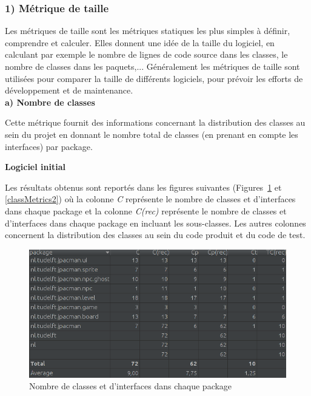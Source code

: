 \documentclass[12pt, openany]{report}
\begin{document}
\subsubsection*{\textbf{\large{1) Métrique de taille}}}


Les métriques de taille sont les métriques statiques les plus simples à définir, comprendre et calculer. Elles donnent une idée de la taille du logiciel, en calculant par exemple le nombre de lignes de code source dans les classes, le nombre de classes dans les paquets,... Généralement les
métriques de taille sont utilisées pour comparer la taille de différents logiciels, pour prévoir les efforts de développement et de maintenance.\\

\textbf{a) Nombre de classes}

Cette métrique fournit des informations concernant la distribution des classes au sein du projet en donnant le nombre total de classes (en prenant en compte les interfaces) par package. 

\textbf{Logiciel initial}

Les résultats obtenus sont reportés dans les figures suivantes (Figures~\ref{classMetrics1} et \ref{classMetrics2}) où la colonne \textit{C} représente le nombre de classes et d'interfaces dans chaque package et la colonne \textit{C(rec)} représente le nombre de classes et d'interfaces dans chaque package en incluant les sous-classes. Les autres colonnes concernent la distribution des classes au sein du code produit et du code de test.

\begin{figure}[!h]
	\centering
	\includegraphics[scale=0.6]{Images/classMetrics1.png} 
	\caption{Nombre de classes et d'interfaces dans chaque package}
	\label{classMetrics1}
\end{figure}
\end{document}
